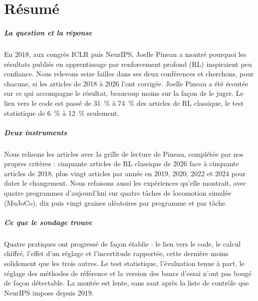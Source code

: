 \chapter*{Résumé}\label{chap:00-resume}

\paragraph{La question et la réponse}
En 2018, aux congrès ICLR puis NeurIPS, Joelle Pineau a montré pourquoi les résultats publiés en
apprentissage par renforcement profond (RL) inspiraient peu confiance. Nous relevons seize failles dans
ses deux conférences et cherchons, pour chacune, si les articles de 2018 à 2026 l'ont corrigée. Joelle Pineau a été écoutée sur ce qui accompagne le résultat, beaucoup
moins sur la façon de le juger. Le lien vers le code est passé de 31~\% à 74~\% des articles de RL
classique, le test statistique de 6~\% à 12~\% seulement.

\paragraph{Deux instruments}
Nous relisons les articles avec la grille de lecture de Pineau, complétée par nos propres critères :
cinquante articles de RL classique de 2026 face à cinquante articles de 2018, plus vingt articles par
année en 2019, 2020, 2022 et 2024 pour dater le changement. Nous refaisons aussi les expériences
qu'elle montrait, avec quatre programmes d'aujourd'hui sur quatre tâches de locomotion simulée
(MuJoCo), dix puis vingt graines aléatoires par programme et par tâche.

\paragraph{Ce que le sondage trouve}
Quatre pratiques ont progressé de façon établie : le lien vers le code, le calcul chiffré, l'effet d'un réglage et l'incertitude rapportée, cette dernière moins solidement que les trois
autres. Le test statistique, l'évaluation tenue à
part, le réglage des méthodes de référence et la version des bancs d'essai n'ont pas bougé de façon
détectable. La montée est lente, sans saut après la liste de contrôle que NeurIPS impose depuis 2019.

